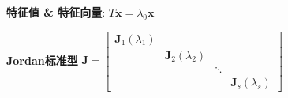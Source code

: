 \documentclass{article}
\begin{document}
        \textbf{特征值 \& 特征向量}: $T \boldsymbol x = \lambda_0 \boldsymbol x$
        

        \textbf{Jordan标准型}
            $\boldsymbol{J}=\left[\begin{array}{llll}
                \boldsymbol{J}_{1}\left(\lambda_{1}\right) & & & \\
                & \boldsymbol{J}_{2}\left(\lambda_{2}\right) & & \\
                & & \ddots & \\
                & & & \boldsymbol{J}_{s}\left(\lambda_{s}\right)
                \end{array}\right]$
\end{document}
